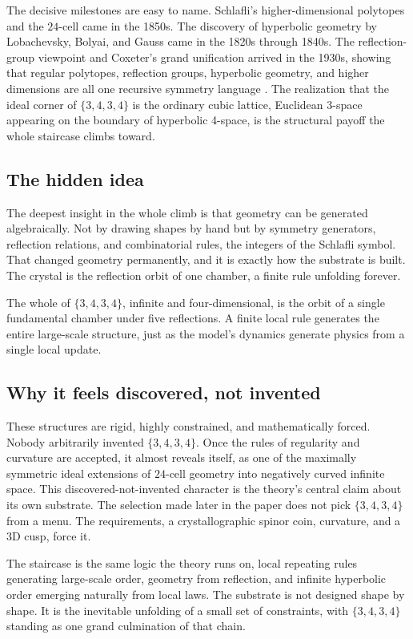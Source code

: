 The decisive milestones are easy to name. Schlafli's higher-dimensional polytopes and the $24$-cell came in the 1850s. The discovery of hyperbolic geometry by Lobachevsky, Bolyai, and Gauss came in the 1820s through 1840s. The reflection-group viewpoint and Coxeter's grand unification arrived in the 1930s, showing that regular polytopes, reflection groups, hyperbolic geometry, and higher dimensions are all one recursive symmetry language \cite{coxeter1973}. The realization that the ideal corner of $\{3,4,3,4\}$ is the ordinary cubic lattice, Euclidean 3-space appearing on the boundary of hyperbolic 4-space, is the structural payoff the whole staircase climbs toward.

\subsection{The hidden idea}

The deepest insight in the whole climb is that geometry can be generated algebraically. Not by drawing shapes by hand but by symmetry generators, reflection relations, and combinatorial rules, the integers of the Schlafli symbol. That changed geometry permanently, and it is exactly how the substrate is built. The crystal is the reflection orbit of one chamber, a finite rule unfolding forever.

\begin{result}
The whole of $\{3,4,3,4\}$, infinite and four-dimensional, is the orbit of a single fundamental chamber under five reflections. A finite local rule generates the entire large-scale structure, just as the model's dynamics generate physics from a single local update.
\end{result}

\subsection{Why it feels discovered, not invented}

These structures are rigid, highly constrained, and mathematically forced. Nobody arbitrarily invented $\{3,4,3,4\}$. Once the rules of regularity and curvature are accepted, it almost reveals itself, as one of the maximally symmetric ideal extensions of $24$-cell geometry into negatively curved infinite space. This discovered-not-invented character is the theory's central claim about its own substrate. The selection made later in the paper does not pick $\{3,4,3,4\}$ from a menu. The requirements, a crystallographic spinor coin, curvature, and a 3D cusp, force it.

The staircase is the same logic the theory runs on, local repeating rules generating large-scale order, geometry from reflection, and infinite hyperbolic order emerging naturally from local laws. The substrate is not designed shape by shape. It is the inevitable unfolding of a small set of constraints, with $\{3,4,3,4\}$ standing as one grand culmination of that chain.
